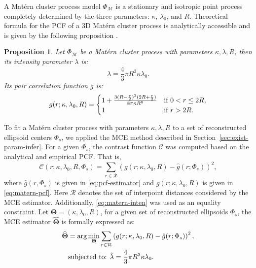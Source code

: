 \documentclass[journal]{IEEEtran}
\newtheorem{prop}{Proposition}[section]%
\begin{document}
A Mat\'ern cluster process model $\Phi_\mathcal{M}$ is a stationary
and isotropic point process completely determined by the three
parameters: $\kappa$, $\lambda_0$, and $R$. Theoretical formula for
the PCF of a 3D Mat\'ern cluster process is analytically accessible
and is given by the following proposition
\cite[p376]{illian2008statistical}.

\begin{prop}
  Let $\Phi_{\mathcal{M}}$ be a Mat\'ern cluster process with
  parameters $\kappa, \lambda, R$, then its intensity parameter
  $\lambda$ is:
  \begin{equation}
    \label{eq:matern-inten}
    \lambda = \frac{4}{3}\pi R^3\kappa \lambda_0.
  \end{equation}
  Its pair correlation function $g$ is:
  \begin{equation}
    \label{eq:matern-pcf}
    g(r; \kappa, \lambda_0, R) =
    \begin{cases}
      1 + \frac{3(R - \frac{r}{2})^2 (2R + \frac{r}{2})} {8\pi \kappa
        R^6}
      & \textnormal{if } 0 < r \leq 2R, \\
      1 & \textnormal{if } r > 2R. \\
    \end{cases}
  \end{equation}
\end{prop}

To fit a Mat\'ern cluster process with parameters $\kappa, \lambda, R$
to a set of reconstructed ellipsoid centers $\Phi_s$, we applied the
MCE method described in Section~\ref{sec:exist-param-infer}. For a
given $\Phi_s$, the contrast function $\mathcal{C}$ was computed based
on the analytical and empirical PCF. That is,
\begin{equation}
  \label{eq:matern-contrast}
  \mathcal{C}(r; \kappa, \lambda_0, R, \Phi_s) =
  \sum_{r \in \mathcal{R}} (g(r; \kappa, \lambda_0, R) -
  \hat{g}(r; \Phi_s))^2,
\end{equation}
where $\hat{g}(r, \Phi_s)$ is given in \eqref{eq:pcf-estimator} and
$g(r; \kappa, \lambda_0, R)$ is given in \eqref{eq:matern-pcf}. Here
$\mathcal{R}$ denotes the set of interpoint distances considered by
the MCE estimator. Additionally, \eqref{eq:matern-inten} was used as
an equality constraint. Let
$\mathbf{\Theta} = \left( \kappa, \lambda_0, R \right)$, for a given
set of reconstructed ellipsoids $\Phi_s$, the MCE estimator
$\widehat{\mathbf{\Theta}}$ is formally expressed as:
\begin{equation}
  \label{eq:mce-est-complete}
  \begin{aligned}
    \widehat{\mathbf{\Theta}} & = \arg \min_{\mathbf{\Theta}} \sum_{r
      \in \mathcal{R}} \left( g(r; \kappa, \lambda_0, R)
      - \hat{g}(r; \Phi_s) \right)^2, \\
    & \textnormal{subjected to: } \hat{\lambda} = \frac{4}{3}\pi
    R^3\kappa \lambda_0.
  \end{aligned}
\end{equation}
\end{document}
